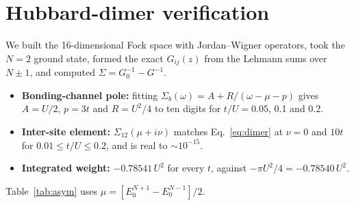 \documentclass[11pt,a4paper]{article}
\begin{document}
\appendix
\section{Hubbard-dimer verification}\label{app:dimer}
We built the 16-dimensional Fock space with Jordan--Wigner operators, took the $N=2$ ground state, formed the exact $G_{ij}(z)$ from the Lehmann sums over $N\pm1$, and computed $\Sigma=G_0^{-1}-G^{-1}$.
\begin{itemize}
\item \textbf{Bonding-channel pole:} fitting $\Sigma_b(\omega)=A+R/(\omega-\mu-p)$ gives $A=U/2$, $p=3t$ and $R=U^2/4$ to ten digits for $t/U=0.05$, 0.1 and 0.2.
\item \textbf{Inter-site element:} $\Sigma_{12}(\mu+i\nu)$ matches Eq.~\eqref{eq:dimer} at $\nu=0$ and $10t$ for $0.01\le t/U\le0.2$, and is real to $\sim10^{-15}$.
\item \textbf{Integrated weight:} $-0.78541\,U^2$ for every $t$, against $-\pi U^2/4=-0.78540\,U^2$.
\end{itemize}
Table~\ref{tab:asym} uses $\mu=[E_0^{N+1}-E_0^{N-1}]/2$.



\end{document}

